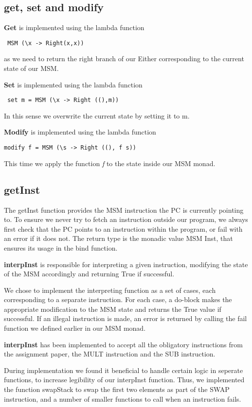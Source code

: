 \documentclass[]{article}
\begin{document}
\subsection{get, set and modify}

\textbf{Get} is implemented using the lambda function\begin{verbatim} MSM (\x -> Right(x,x)) \end{verbatim}as we need to return the right branch of our Either corresponding to the current state of our MSM.\par
\textbf{Set} is implemented using the lambda function\begin{verbatim} set m = MSM (\x -> Right ((),m))\end{verbatim} 
In this sense we overwrite the current state by setting it to m.\par
\textbf{Modify} is implemented using the lambda function \begin{verbatim}modify f = MSM (\s -> Right ((), f s))\end{verbatim} 
This time we apply the function \emph{f} to the state inside our MSM monad. \par

\subsection{getInst}

The getInst function provides the MSM instruction the PC is currently pointing to. To ensure we never try to fetch an instruction outside our program, we always first check that the PC points to an instruction within the program, or fail with an error if it does not. The return type is the monadic value MSM Inst, that ensures its usage in the bind function.\par
\textbf{interpInst} is responsible for interpreting a given instruction, modifying the state of the MSM accordingly and returning True if successful.\par

We chose to implement the interpreting function as a set of cases, each corresponding to a separate instruction. For each case, a do-block makes the appropriate modification to the MSM state and returns the True value if successful. If an illegal instruction is made, an error is returned by calling the fail function we defined earlier in our MSM monad.\par
\textbf{interpInst} has been implemented to accept all the obligatory instructions from the assignment paper, the MULT instruction and the SUB instruction.\par
During implementation we found it beneficial to handle certain logic in seperate functions, to increase legibility of our interpInst function. Thus, we implemented the function swapStack to swap the first two elements as part of the SWAP instruction, and a number of smaller functions to call when an instruction fails.\par
\end{document}

